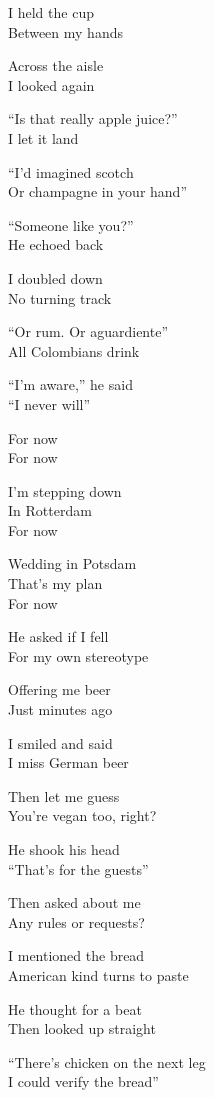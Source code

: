 \begin{lyrics}
I held the cup\\
Between my hands

Across the aisle\\
I looked again

“Is that really apple juice?”\\
I let it land

“I’d imagined scotch\\
Or champagne in your hand”

“Someone like you?”\\
He echoed back

I doubled down\\
No turning track

“Or rum. Or aguardiente”\\
All Colombians drink

“I’m aware,” he said\\
“I never will”

For now\\
For now

I’m stepping down\\
In Rotterdam\\
For now

Wedding in Potsdam\\
That’s my plan\\
For now

He asked if I fell\\
For my own stereotype

Offering me beer\\
Just minutes ago

I smiled and said\\
I miss German beer

Then let me guess\\
You’re vegan too, right?

He shook his head\\
“That’s for the guests”

Then asked about me\\
Any rules or requests?

I mentioned the bread\\
American kind turns to paste

He thought for a beat\\
Then looked up straight

“There’s chicken on the next leg\\
I could verify the bread”


\end{lyrics}
